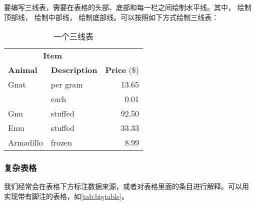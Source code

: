要编写三线表，需要在表格的头部、底部和每一栏之间绘制水平线。其中， 绘制顶部线， 绘制中部线， 绘制底部线。可以按照如下方式绘制三线表：
\begin{table}[!hpt]
  \caption{一个三线表}
  \label{tab:firstone}
  \centering
  \begin{tabular}{@{}llr@{}} \toprule
    \multicolumn{2}{c}{\textbf{Item}} \\ \cmidrule(r){1-2}
    \textbf{Animal} & \textbf{Description} & \textbf{Price} (\$) \\ \midrule
    Gnat            & per gram             & 13.65               \\
                    & each                 & 0.01                \\
    Gnu             & stuffed              & 92.50               \\
    Emu             & stuffed              & 33.33               \\
    Armadillo       & frozen               & 8.99                \\ \bottomrule
  \end{tabular}
\end{table}

\subsubsection{复杂表格}

我们经常会在表格下方标注数据来源，或者对表格里面的条目进行解释。可以用
 实现带有脚注的表格，如\cref{tab:bigtable}。

